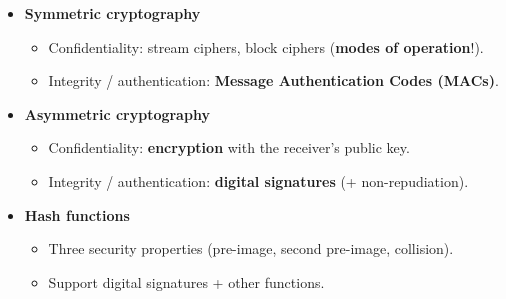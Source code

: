 \begin{keybox}[title={Summary: what we have learned about applied cryptography}]
\begin{itemize}
  \item \textbf{Symmetric cryptography}
        \begin{itemize}
          \item Confidentiality: stream ciphers, block ciphers (\textbf{modes of
                operation}!).
          \item Integrity / authentication: \textbf{Message Authentication Codes (MACs)}.
        \end{itemize}
  \item \textbf{Asymmetric cryptography}
        \begin{itemize}
          \item Confidentiality: \textbf{encryption} with the receiver's public key.
          \item Integrity / authentication: \textbf{digital signatures} (+
                non-repudiation).
        \end{itemize}
  \item \textbf{Hash functions}
        \begin{itemize}
          \item Three security properties (pre-image, second pre-image, collision).
          \item Support digital signatures + other functions.
        \end{itemize}
\end{itemize}
\end{keybox}

